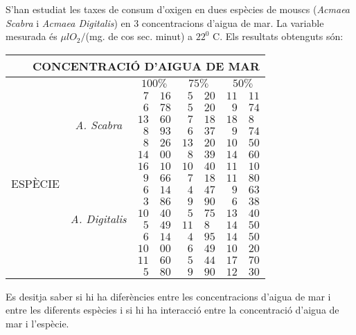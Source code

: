 \begin{probres}
{S'han estudiat les taxes de
consum d'oxigen en dues esp\`ecies de mo{\lgem}uscs ({\it Acmaea
Scabra} i {\it Acmaea Digitalis}) en $3$ concentracions
d'aigua de mar. \newline La variable mesurada \'es 
$\mu l O_2 /$(mg. de  cos sec. minut) a
$22^0$ C.
\newline Els resultats obtenguts s\'on:
\begin{center}
\begin{tabular}{c|c|r@{.}l|r@{.}l|r@{.}l|}
\multicolumn{8}{r|}{CONCENTRACI\'O D'AIGUA DE MAR}\\\hline
&&\multicolumn{2}{c|}{$100\%$}&
\multicolumn{2}{c|}{$75\%$}&
\multicolumn{2}{c|}{$50\%$}\\\cline{3-8}
\multirow{16}{2cm}{ESP\`ECIE}&\multirow{6}{2.5cm}{{\it A. Scabra}}&
$7$&$16$&$5$&$20$&$11$&$11$\\\cline{3-8}
&&$6$&$78$&$5$&$20$&$9$&$74$\\\cline{3-8}
&&$13$&$60$&$7$&$18$&$18$&$8$\\\cline{3-8}
&&$8$&$93$&$6$&$37$&$9$&$74$\\\cline{3-8}
&&$8$&$26$&$13$&$20$&$10$&$50$\\\cline{3-8}
&&$14$&$00$&$8$&$39$&$14$&$60$\\\cline{3-8}
&&$16$&$10$&$10$&$40$&$11$&$10$\\\cline{3-8}
&&$9$&$66$&$7$&$18$&$11$&$80$\\\cline{2-8}
&\multirow{6}{2.5cm}{{\it A. Digitalis}}&
$6$&$14$&$4$&$47$&$9$&$63$\\\cline{3-8}
&&$3$&$86$&$9$&$90$&$6$&$38$\\\cline{3-8}
&&$10$&$40$&$5$&$75$&$13$&$40$\\\cline{3-8}
&&$5$&$49$&$11$&$8$&$14$&$50$\\\cline{3-8}
&&$6$&$14$&$4$&$95$&$14$&$50$\\\cline{3-8}
&&$10$&$00$&$6$&$49$&$10$&$20$\\\cline{3-8}
&&$11$&$60$&$5$&$44$&$17$&$70$\\\cline{3-8}
&&$5$&$80$&$9$&$90$&$12$&$30$\\\hline
\end{tabular}
\end{center}

Es desitja saber si hi ha difer\`encies entre les
concentracions d'aigua de mar i entre les diferents
esp\`ecies i si hi ha interacci\'o entre la
concentraci\'o d'aigua de mar i l'esp\`ecie.}
\end{probres}

